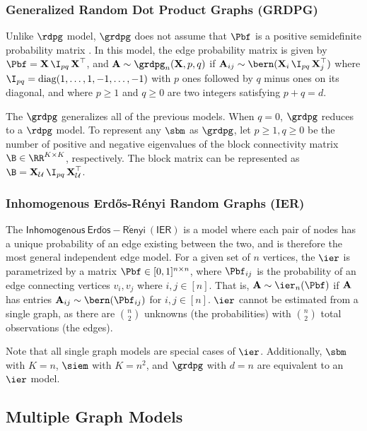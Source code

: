 \subsubsection{Generalized Random Dot Product Graphs (GRDPG)}\label{sec:grdpg}
Unlike $\rdpg$ model, $\grdpg$ does not assume that $\Pbf$ is a positive semidefinite probability matrix  \citep{rubin2017statistical}. In this model, the edge probability matrix is given by $\Pbf=\X \I_{pq}\X^\top$, and $\A\sim\grdpg_n(
\X, p, q)$ if $\A_{ij}\sim\bern(\X_i\I_{pq}\X_j^\top)$ where $\I_{pq}=\textrm{diag}(1, \ldots, 1, -1, \ldots, -1)$  with $p$ ones followed by $q$ minus ones on its diagonal, and where $p \geq 1$ and $q \geq 0$ are two integers satisfying $p + q = d$.

The $\grdpg$ generalizes all of the previous models. When $q=0$, $\grdpg$ reduces to a $\rdpg$ model. To represent any $\sbm$ as $\grdpg$, let $p\geq 1, q\geq 0$ be the number of positive and negative eigenvalues of the block connectivity matrix $\B\in\RR^{K\times K}$, respectively. The block matrix can be represented as $\B = \X_\mathcal{U}\I_{pq}\X_\mathcal{U}^\top$.


\subsubsection{Inhomogenous Erd\H os-R\'enyi Random Graphs (IER)}\label{sec:uierrg}
The $\mathsf{Inhomogenous~Erd\ddot{o}s-R\acute{e}nyi~(IER)}$ is a model where each pair of nodes has a unique probability of an edge existing between the two, and is therefore the most general independent edge model. For a given set of $n$ vertices, the $\ier$ is parametrized by a matrix $\Pbf \in [0, 1]^{n \times n}$, where $\Pbf_{ij}$ is the probability of an edge connecting vertices $v_i, v_j$ where $i, j \in [n]$. That is, $\A \sim \ier_n(\Pbf)$ if $\operatorname{\mathbf{A}}$ has entries $\A_{ij}\sim \bern(\Pbf_{ij})$ for $i, j \in [n]$. $\ier$ cannot be estimated from a single graph, as there are $n\choose 2$ unknowns (the probabilities) with $n\choose 2$ total observations (the edges).

Note that all single graph models are special cases of $\ier$. Additionally, $\sbm$ with $K=n$, $\siem$ with $K=n^2$, and $\grdpg$ with $d=n$ are equivalent to an $\ier$ model.

\subsection{Multiple Graph Models}\label{sec:multi_graph_models}


